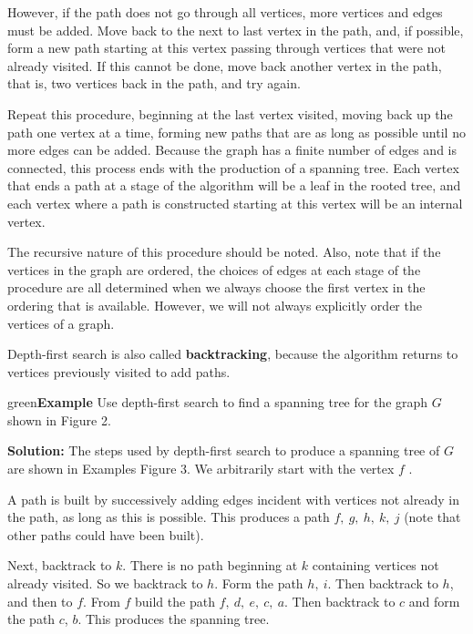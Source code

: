 \documentclass{article}
\newenvironment{example}{\begin{mybox}{green}{\textbf{Example}}}{\end{mybox}}
\begin{document}
However, if the path does not go through all vertices, more vertices and edges must be added. Move back to the next to last vertex in the path, and, if possible, form a new path starting at this vertex passing through vertices that were not already visited. If this cannot be done, move back another vertex in the path, that is, two vertices back in the path, and try again.

Repeat this procedure, beginning at the last vertex visited, moving back up the path one vertex at a time, forming new paths that are as long as possible until no more edges can be added. Because the graph has a finite number of edges and is connected, this process ends with the production of a spanning tree. Each vertex that ends a path at a stage of the algorithm will be a leaf in the rooted tree, and each vertex where a path is constructed starting at this vertex will be an internal vertex.

The recursive nature of this procedure should be noted. Also, note that if the vertices in the graph are ordered, the choices of edges at each stage of the procedure are all determined when we always choose the first vertex in the ordering that is available. However, we will not always explicitly order the vertices of a graph.

Depth-first search is also called \textbf{backtracking}, because the algorithm returns to vertices previously visited to add paths.


\begin{example}
Use depth-first search to find a spanning tree for the graph $G$ shown in Figure 2.

\textbf{Solution:} The steps used by depth-first search to produce a spanning tree of $G$ are shown in Examples Figure 3. We arbitrarily start with the vertex $f$ . 

A path is built by successively adding edges incident with vertices not already in the path, as long as this is possible. This produces a path $f,\ g,\ h,\ k,\ j$ (note that other paths could have been built). 

Next, backtrack to $k$. There is no path beginning at $k$ containing vertices not already visited. So we backtrack to $h$. Form the path $h,\ i$. Then backtrack to $h$, and then to $f$. From $f$ build the path $f,\ d,\ e,\ c,\ a$. Then backtrack to $c$ and form the path $c$, $b$. This produces the spanning tree.
\end{example}
\end{document}
